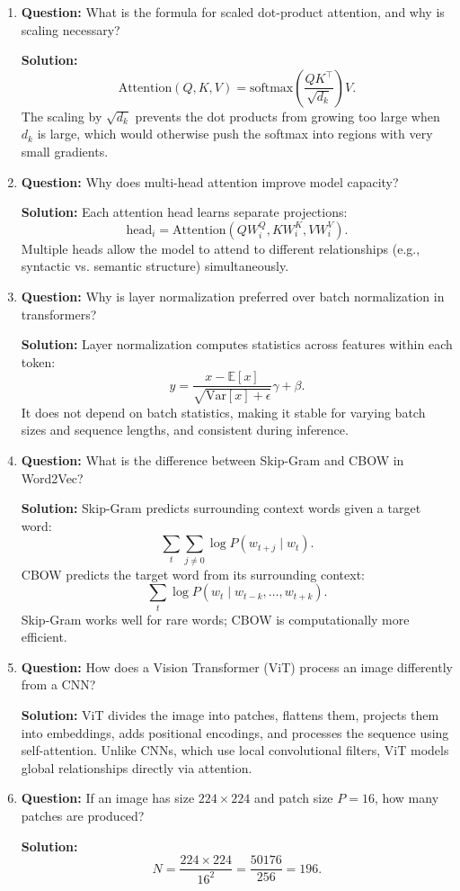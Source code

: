 \documentclass{article}
\begin{document}
\begin{enumerate}

\item \textbf{Question:}
What is the formula for scaled dot-product attention, and why is scaling necessary?

\textbf{Solution:}
\[
\text{Attention}(Q,K,V)
= \text{softmax}\!\left(\frac{QK^\top}{\sqrt{d_k}}\right)V.
\]
The scaling by $\sqrt{d_k}$ prevents the dot products from growing too large when $d_k$ is large, which would otherwise push the softmax into regions with very small gradients.

\item \textbf{Question:}
Why does multi-head attention improve model capacity?

\textbf{Solution:}
Each attention head learns separate projections:
\[
\text{head}_i = \text{Attention}(QW_i^Q, KW_i^K, VW_i^V).
\]
Multiple heads allow the model to attend to different relationships (e.g., syntactic vs. semantic structure) simultaneously.


\item \textbf{Question:}
Why is layer normalization preferred over batch normalization in transformers?

\textbf{Solution:}
Layer normalization computes statistics across features within each token:
\[
y = \frac{x - \mathbb{E}[x]}{\sqrt{\mathrm{Var}[x]+\epsilon}}\gamma + \beta.
\]
It does not depend on batch statistics, making it stable for varying batch sizes and sequence lengths, and consistent during inference.


\item \textbf{Question:}
What is the difference between Skip-Gram and CBOW in Word2Vec?

\textbf{Solution:}
Skip-Gram predicts surrounding context words given a target word:
\[
\sum_{t}\sum_{j\neq0} \log P(w_{t+j}\mid w_t).
\]
CBOW predicts the target word from its surrounding context:
\[
\sum_t \log P(w_t\mid w_{t-k},\dots,w_{t+k}).
\]
Skip-Gram works well for rare words; CBOW is computationally more efficient.


\item \textbf{Question:}
How does a Vision Transformer (ViT) process an image differently from a CNN?

\textbf{Solution:}
ViT divides the image into patches, flattens them, projects them into embeddings, adds positional encodings, and processes the sequence using self-attention. Unlike CNNs, which use local convolutional filters, ViT models global relationships directly via attention.

\item \textbf{Question:}
If an image has size $224 \times 224$ and patch size $P=16$, how many patches are produced?

\textbf{Solution:}
\[
N = \frac{224 \times 224}{16^2}
= \frac{50176}{256}
= 196.
\]

\end{enumerate}
\end{document}
